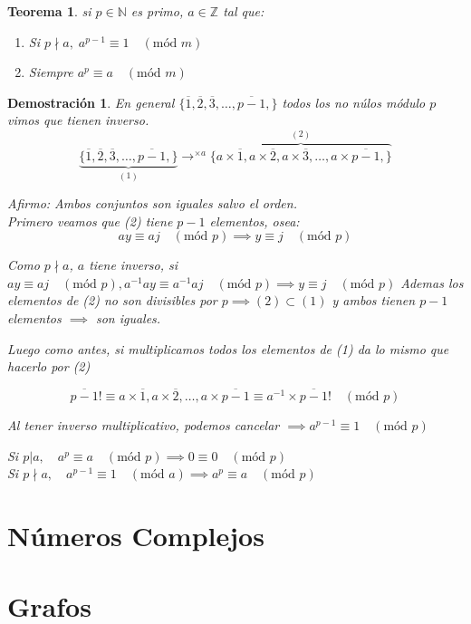 \documentclass[9pt,a4paper,draft]{article}
\theoremstyle{definition}
\theoremstyle{plain}
\newtheorem{teo}{Teorema}
\newtheorem{demo}{Demostración}[teo]
\newcommand{\modu}[1]{\quad(\text{mód }#1)}
\begin{document}
\begin{teo} si $p\in{\mathbb{N}}$ es primo, $a\in{\mathbb{Z}}$ tal que:
\begin{enumerate}
\item Si $p\nmid a,\; a^{p-1}\equiv1\modu{m}$
\item Siempre $a^p\equiv a\modu{m}$
\end{enumerate}
\end{teo}

\begin{demo}
En general $\{\overline{1},\overline{2},\overline{3},\dots, \overline{p-1},\}$ todos los no núlos módulo $p$ vimos que tienen inverso.
$$\underbrace{\{\overline{1},\overline{2},\overline{3},\dots, \overline{p-1},\}}_{(1)} \to^{\times{a}} \overbrace{\{a\times\overline{1},a\times\overline{2},a\times\overline{3},\dots, a\times\overline{p-1},\}}^{(2)}$$

Afirmo: Ambos conjuntos son iguales salvo el orden.\\
Primero veamos que (2) tiene $p-1$ elementos, osea:
$$ay\equiv aj\modu{p}\implies y\equiv j\modu{p}$$

Como $p\nmid a$, $a$ tiene inverso, si $ay\equiv aj\modu{p}, a^{-1}ay \equiv a^{-1}aj\modu{p} \implies y\equiv j\modu{p}$
Ademas los elementos de (2) no son divisibles por $p\implies(2)\subset(1)$ y ambos tienen $p-1$ elementos $\implies$ son iguales.

Luego como antes, si multiplicamos todos los elementos de (1) da lo mismo que hacerlo por (2)

$$ \overline{p-1}! \equiv a\times\overline{1}, a\times\overline{2}, \dots, a\times\overline{p-1} \equiv a^{-1}\times\overline{p-1}! \modu{p}$$

Al tener inverso multiplicativo, podemos cancelar $\implies a^{p-1}\equiv1\modu{p}$

Si $p|a,\quad a^p\equiv a \modu{p} \implies 0\equiv0\modu{p}$\\
Si $p\nmid a, \quad a^{p-1}\equiv1\modu{a} \implies a^p\equiv a\modu{p}$
\end{demo}

\part{Números Complejos}

\part{Grafos}
\end{document}
